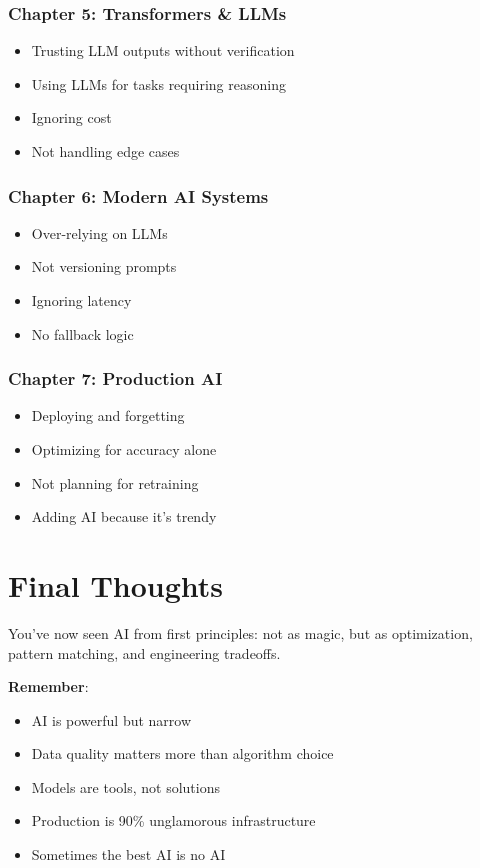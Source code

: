 \documentclass[11pt,oneside]{book}
\begin{document}
\subsubsection*{Chapter 5: Transformers \& LLMs}

\begin{itemize}
\item Trusting LLM outputs without verification
\item Using LLMs for tasks requiring reasoning
\item Ignoring cost
\item Not handling edge cases
\end{itemize}

\subsubsection*{Chapter 6: Modern AI Systems}

\begin{itemize}
\item Over-relying on LLMs
\item Not versioning prompts
\item Ignoring latency
\item No fallback logic
\end{itemize}

\subsubsection*{Chapter 7: Production AI}

\begin{itemize}
\item Deploying and forgetting
\item Optimizing for accuracy alone
\item Not planning for retraining
\item Adding AI because it's trendy
\end{itemize}

\section*{Final Thoughts}

You've now seen AI from first principles: not as magic, but as optimization, pattern matching, and engineering tradeoffs.

\textbf{Remember}:
\begin{itemize}
\item AI is powerful but narrow
\item Data quality matters more than algorithm choice
\item Models are tools, not solutions
\item Production is 90\% unglamorous infrastructure
\item Sometimes the best AI is no AI
\end{itemize}
\end{document}
